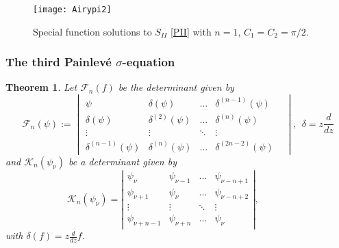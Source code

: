 \documentclass[12pt]{article}
\def\P{Painlev\'e }
\def\F{\mathcal{F}}
\newtheorem{mydef}{Theorem}[section]
\numberwithin{figure}{section}
\numberwithin{equation}{section}
\numberwithin{table}{section}
\begin{document}
\begin{figure}[H]
\centering
\texttt{[image: Airypi2]}
\caption{Special function solutions to $S_{II}$ \eqref{PII} with $n=1$, $C_1=C_2=\pi/2$.}
\end{figure}

\subsubsection{The third \P $\sigma$-equation}
\begin{mydef}
Let $\F_{n}(f)$ be the determinant given by
\[
\mathcal{F}_n(\psi)\!:=\!\begin{vmatrix}
\psi & \delta(\psi) &\hdots& \delta^{(n-1)}(\psi) \\
\delta(\psi) & \delta^{(2)}(\psi) &\hdots& \delta^{(n)}(\psi)  \\
\vdots &\vdots & \ddots & \vdots & \\
\delta^{(n-1)}(\psi) & \delta^{(n)}(\psi) &\hdots& \delta^{(2n-2)}(\psi)
\end{vmatrix},~~\delta=z\frac{d}{dz}
\]
and $\mathcal{K}_n(\psi_\nu)$ be a determinant given by
\[
\mathcal{K}_n(\psi_\nu)\!=\!\left| \begin{array}{cccc}
\psi_{\nu} & \psi_{\nu-1} &  ...& \psi_{\nu-n+1} \\
\psi_{\nu+1} & \psi_{\nu} &  ...& \psi_{\nu-n+2} \\
\vdots &\vdots & \ddots & \vdots  \\
\psi_{\nu+n-1} & \psi_{\nu+n} & ...& \psi_{\nu}  \end{array} \right|,~~~~~~~~~~~~~~
\]
with $\delta(f) = z\frac{d}{dz}f$.


\end{mydef}
\end{document}
